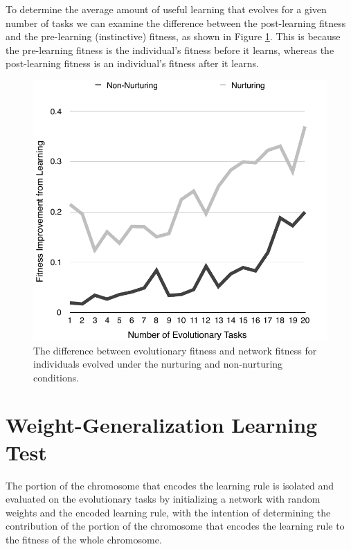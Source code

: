 \documentclass[master]{outhesis}
\begin{document}
To determine the average amount of useful learning that evolves for a given number of tasks we can examine the difference between the post-learning fitness and the pre-learning (instinctive) fitness, as shown in Figure \ref{fig:LearningImprovement}.
This is because the pre-learning fitness is the individual's fitness before it learns, whereas the post-learning fitness is an individual's fitness after it learns.

\begin{figure}[H]
	\centering
	\includegraphics{LearningImprovementPlot.pdf}
	\caption{The difference between evolutionary fitness and network fitness for individuals evolved under the nurturing and non-nurturing conditions.}
	\label{fig:LearningImprovement}
\end{figure}

\section{Weight-Generalization Learning Test}

The portion of the chromosome that encodes the learning rule is isolated and evaluated on the evolutionary tasks by initializing a network with random weights and the encoded learning rule, with the intention of determining the contribution of the portion of the chromosome that encodes the learning rule to the fitness of the whole chromosome.
\end{document}
